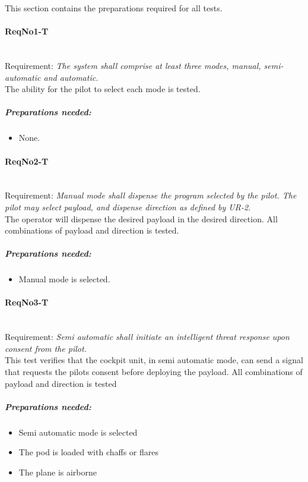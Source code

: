 \noindent
This section contains the preparations required for all tests.

\paragraph{ReqNo1-T}\mbox{}\\ %
Requirement: \textit{The system shall comprise at least three modes, manual, semi-automatic and automatic.}
\\
The ability for the pilot to select each mode is tested.

	\subparagraph{Preparations needed:}
	\begin{itemize}
	\item None.
	\end{itemize}


\paragraph{ReqNo2-T}\mbox{}\\ %
Requirement: \textit{Manual mode shall dispense the program selected by the pilot. The pilot may select payload, and dispense direction as defined by UR-2.}
\\
The operator will dispense the desired payload in the desired direction. All combinations of payload and direction is tested.
\\
	\subparagraph{Preparations needed:}
	\begin{itemize}
	\item Manual mode is selected.
	\end{itemize}


\paragraph{ReqNo3-T}\mbox{}\\ %
Requirement: \textit{Semi automatic shall initiate an intelligent threat response upon consent from the pilot.}
\\
This test verifies that the cockpit unit, in semi automatic mode, can send a signal that requests the pilots consent before deploying the payload. All combinations of payload and direction is tested
\\
	\subparagraph{Preparations needed:}
	\begin{itemize} 
	\item Semi automatic mode is selected
	\item The pod is loaded with chaffs or flares
	\item The plane is airborne
	\end{itemize}


